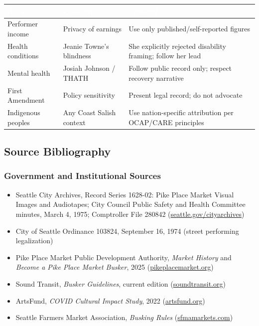 \documentclass[11pt,letterpaper]{article}
\newcommand{\tableheader}[1]{\textbf{\sffamily\textcolor{white}{#1}}}
\begin{document}
\begin{center}
\begin{tabularx}{\textwidth}{L{3cm}L{3cm}X}
\toprule
{}
\tableheader{Area} & \tableheader{Concern} & \tableheader{Protocol} \\
\midrule
Performer income & Privacy of earnings & Use only published/self-reported figures \\
Health conditions & Jeanie Towne's blindness & She explicitly rejected disability framing; follow her lead \\
Mental health & Josiah Johnson / THATH & Follow public record only; respect recovery narrative \\
First Amendment & Policy sensitivity & Present legal record; do not advocate \\
Indigenous peoples & Any Coast Salish context & Use nation-specific attribution per OCAP/CARE principles \\
\bottomrule
\end{tabularx}
\end{center}

\subsection{Source Bibliography}

\subsubsection{Government and Institutional Sources}

\begin{itemize}[leftmargin=1.5em]
  \item Seattle City Archives, Record Series 1628-02: Pike Place Market Visual Images and Audiotapes; City Council Public Safety and Health Committee minutes, March 4, 1975; Comptroller File 280842 (\url{seattle.gov/cityarchives})
  \item City of Seattle Ordinance 103824, September 16, 1974 (street performing legalization)
  \item Pike Place Market Public Development Authority, \textit{Market History} and \textit{Become a Pike Place Market Busker}, 2025 (\url{pikeplacemarket.org})
  \item Sound Transit, \textit{Busker Guidelines}, current edition (\url{soundtransit.org})
  \item ArtsFund, \textit{COVID Cultural Impact Study}, 2022 (\url{artsfund.org})
  \item Seattle Farmers Market Association, \textit{Busking Rules} (\url{sfmamarkets.com})
\end{itemize}
\end{document}
